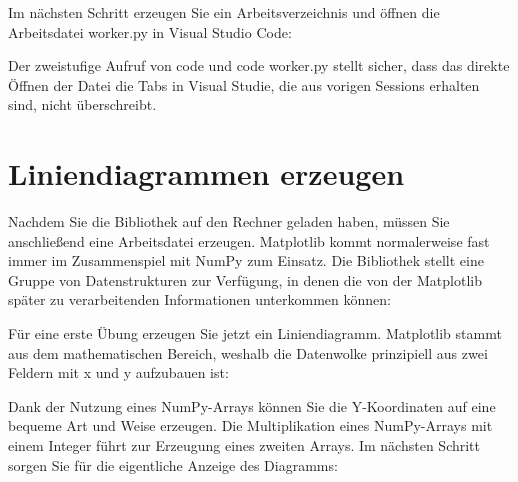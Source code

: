 Im nächsten Schritt erzeugen Sie ein Arbeitsverzeichnis und öffnen die Arbeitsdatei worker.py in Visual Studio Code:

\medskip






\medskip

Der zweistufige Aufruf von code und code worker.py stellt sicher, dass das direkte Öffnen der Datei die Tabs in Visual Studie, die aus vorigen Sessions erhalten sind, nicht überschreibt.


\section{Liniendiagrammen erzeugen}

Nachdem Sie die Bibliothek auf den Rechner geladen haben, müssen Sie anschließend eine Arbeitsdatei erzeugen. Matplotlib kommt normalerweise fast immer im Zusammenspiel mit NumPy zum Einsatz. Die Bibliothek stellt eine Gruppe von Datenstrukturen zur Verfügung, in denen die von der Matplotlib später zu verarbeitenden Informationen unterkommen können:

\medskip



\medskip

Für eine erste Übung erzeugen Sie jetzt ein Liniendiagramm. Matplotlib stammt aus dem mathematischen Bereich, weshalb die Datenwolke prinzipiell aus zwei Feldern mit x und y aufzubauen ist:

\medskip



\medskip

Dank der Nutzung eines NumPy-Arrays können Sie die Y-Koordinaten auf eine bequeme Art und Weise erzeugen. Die Multiplikation eines NumPy-Arrays mit einem Integer führt zur Erzeugung eines zweiten Arrays. Im nächsten Schritt sorgen Sie für die eigentliche Anzeige des Diagramms:

